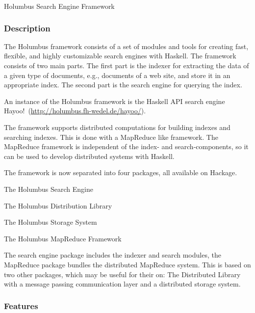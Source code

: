 \begin{hcarentry}[updated]{Holumbus Search Engine Framework}
\label{holumbus}
\makeheader

\subsubsection*{Description}

The Holumbus framework consists of a set of modules and tools
for creating fast, flexible, and highly customizable search engines with Haskell.
The framework consists of two main parts. The first part is the indexer for extracting the data
of a given type of documents, e.g., documents of a web site, and store it in an appropriate index.
The second part is the search engine for querying the index.

An instance of the Holumbus framework is the Haskell API search engine Hayoo!\
(\url{http://holumbus.fh-wedel.de/hayoo/}).

The framework supports distributed computations for building indexes
and searching indexes. This is done with a MapReduce like framework.
The MapReduce framework is independent of the index- and
search-components, so it can be used to develop distributed systems
with Haskell.

The framework is now separated into four packages, all available on
Hackage.

\begin{compactitem}
\item The Holumbus Search Engine 
\item The Holumbus Distribution Library
\item The Holumbus Storage System
\item The Holumbus MapReduce Framework
\end{compactitem}

The search engine package includes the indexer and search modules,
the MapReduce package bundles the distributed MapReduce system.
This is based on two other packages, which may be useful for their on:
The Distributed Library with a message passing communication layer
and a distributed storage system.

\subsubsection*{Features}


\end{hcarentry}

